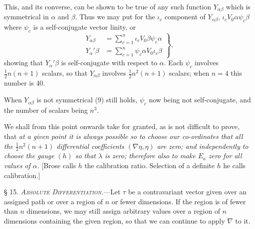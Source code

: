 \documentclass[11pt]{article}
\begin{document}
\indent This, and its converse, can be shown to be true of any such function $Y_{\alpha\beta}$ which is symmetrical in $\alpha$ and $\beta$. Thus we may put for the $\iota_c$ component of $Y_{\alpha\beta}$, $\iota_cV_0\alpha\psi_c\beta$ where $\psi_c$ is a self-conjugate vector linity, or
\begin{equation}\left.\begin{aligned}
Y_{\alpha\beta}&=\sum_{c=1}^n\iota_cV_0\beta\psi_c\alpha\\
Y_\alpha'\beta&=\sum_{c=1}^n\psi_c\alpha V_0\iota_c\beta
\end{aligned}\right\},\tag{9}\end{equation}
showing that $Y_\alpha'\beta$ is self-conjugate with respect to $\alpha$. Each $\psi_c$ involves $\tfrac12n(n+1)$ scalars, so that $Y_{\alpha\beta}$ involves $\tfrac12n^2(n+1)$ scalars; when $n=4$ this number is 40.

\indent When $Y_{\alpha\beta}$ is not symmetrical (9) still holds, $\psi_c$ now being not self-conjugate, and the number of scalars being $n^3$.

\indent We shall from this point onwards take for granted, as is not difficult to prove, that \emph{at a given point it is always possible so to choose our co-ordinates that all the $\tfrac12n^2(n+1)$ differential coefficients $(\nabla\eta,\eta)$ are zero; and independently to choose the gauge $(h)$ so that $\lambda$ is zero; therefore also to make $E_a$ zero for all values of $\alpha$.} [Brose calls $h$ the calibration ratio. Selection of a definite $h$ he calls calibration.]

\indent\textsc{§ 15. \emph{Absolute Differentiation.}}---Let $\tau$ be a contravariant vector given over an assigned path or over a region of $n$ or fewer dimensions. If the region is of fewer than $n$ dimensions, we may still assign arbitrary values over a region of $n$ dimensions containing the given region, so that we can continue to apply $\nabla$ to it.
\end{document}
